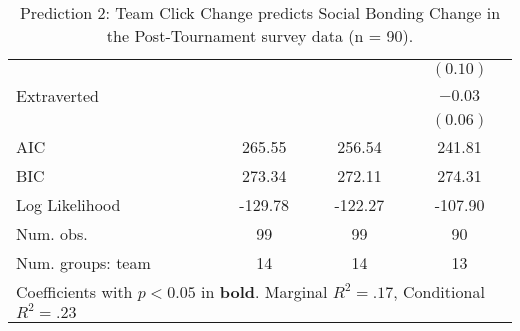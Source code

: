 \begin{table}
\begin{center}
\begin{tabular}{l c c c }
                                               &                       &                       & $(0.10)$             \\
Extraverted                                    &                       &                       & $-0.03$              \\
                                               &                       &                       & $(0.06)$             \\
\midrule
AIC                                            & 265.55                & 256.54                & 241.81               \\
BIC                                            & 273.34                & 272.11                & 274.31               \\
Log Likelihood                                 & -129.78               & -122.27               & -107.90              \\
Num. obs.                                      & 99                    & 99                    & 90                   \\
Num. groups: team                              & 14                    & 14                    & 13                   \\
\bottomrule
\multicolumn{4}{l}{\scriptsize{Coefficients with $p < 0.05$ in \textbf{bold}. Marginal $R^2 = .17$, Conditional $R^2 = .23$}}
\end{tabular}
\caption{Prediction 2: Team Click Change predicts Social Bonding Change in the Post-Tournament survey data (n = 90).}
\label{tab:MLM22acClickcBonding}
\end{center}
\end{table}
